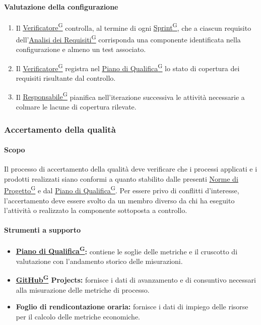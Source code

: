 \documentclass[a4paper,12pt]{article}
\providecommand{\glslink}[2]{\href{https://alittlebyte-19.github.io/Documentazione/glossario.html\#gls-#1}{\underline{#2}\textsuperscript{\scriptsize G}}}
\begin{document}
\paragraph{Valutazione della configurazione}
\begin{enumerate}
    \item Il \glslink{verificatore}{Verificatore} controlla, al termine di ogni \glslink{sprint}{Sprint}, che a ciascun requisito dell'\glslink{analisi-dei-requisiti-adr}{Analisi dei Requisiti} corrisponda una componente identificata nella configurazione e almeno un test associato.
    \item Il \glslink{verificatore}{Verificatore} registra nel \glslink{piano-di-qualifica}{Piano di Qualifica} lo stato di copertura dei requisiti risultante dal controllo.
    \item Il \glslink{responsabile}{Responsabile} pianifica nell'iterazione successiva le attività necessarie a colmare le lacune di copertura rilevate.
\end{enumerate}

\subsubsection{Accertamento della qualità}

\paragraph{Scopo}
Il processo di accertamento della qualità deve verificare che i processi applicati e i prodotti realizzati siano conformi a quanto stabilito dalle presenti \glslink{norme-di-progetto}{Norme di Progetto} e dal \glslink{piano-di-qualifica}{Piano di Qualifica}. Per essere privo di conflitti d'interesse, l'accertamento deve essere svolto da un membro diverso da chi ha eseguito l'attività o realizzato la componente sottoposta a controllo.

\paragraph{Strumenti a supporto}
\begin{itemize}
    \item \textbf{\glslink{piano-di-qualifica}{Piano di Qualifica}:} contiene le soglie delle metriche e il cruscotto di valutazione con l'andamento storico delle misurazioni.
    \item \textbf{\glslink{github}{GitHub} Projects:} fornisce i dati di avanzamento e di consuntivo necessari alla misurazione delle metriche di processo.
    \item \textbf{Foglio di rendicontazione oraria:} fornisce i dati di impiego delle risorse per il calcolo delle metriche economiche.
\end{itemize}
\end{document}
